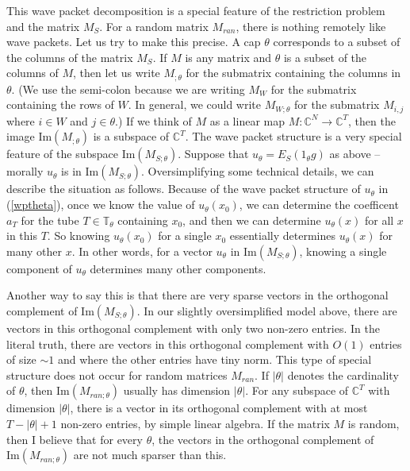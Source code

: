 \documentclass{amsart}
\newcommand{\CC}{\mathbb{C}}
\newcommand{\TT}{\mathbb{T}}
\begin{document}
\newcommand{\image}{\textrm{Im}}

This wave packet decomposition is a special feature of the restriction problem and the matrix $M_S$.   For a random matrix $M_{ran}$, there is nothing remotely like wave packets.  Let us try to make this precise.  A cap $\theta$ corresponds to a subset of the columns of the matrix $M_S$.  If $M$ is any matrix and $\theta$ is a subset of the columns of $M$, then let us write $M_{;\theta}$ for the submatrix containing the columns in $\theta$.  (We use the semi-colon because we are writing $M_W$ for the submatrix containing the rows of $W$.  In general, we could write $M_{W;\theta}$ for the submatrix $M_{i,j}$ where $i \in W$ and $j \in \theta$.)   If we think of $M$ as a linear map $M: \CC^N \rightarrow \CC^T$, then the image $\image(M_{;\theta})$ is a subspace of $\CC^T$.  The wave packet structure is a very special feature of the subspace $\image(M_{S; \theta})$.  Suppose that $u_\theta = E_S (1_\theta g)$ as above -- morally $u_\theta$ is in $\image(M_{S; \theta})$.  Oversimplifying some technical details, we can describe the situation as follows.  Because of the wave packet structure of $u_\theta$ in (\ref{wptheta}), once we know the value of $u_\theta(x_0)$, we can determine the coefficent $a_T$ for the tube $T \in \TT_\theta$ containing $x_0$, and then we can determine $u_\theta(x)$ for all $x$ in this $T$.  So knowing $u_\theta(x_0)$ for a single $x_0$ essentially determines $u_\theta(x)$ for many other $x$.  In other words, for a vector $u_\theta$ in $\image(M_{S; \theta})$, knowing a single component of $u_\theta$ determines many other components.

Another way to say this is that there are very sparse vectors in the orthogonal complement of $\image(M_{S; \theta})$.  In our slightly oversimplified model above, there are vectors in this orthogonal complement with only two non-zero entries.  In the literal truth, there are vectors in this orthogonal complement with $O(1)$ entries of size $\sim 1$ and where the other entries have tiny norm.  This type of special structure does not occur for random matrices $M_{ran}$.  If $|\theta|$ denotes the cardinality of $\theta$, then $\image(M_{ran; \theta})$ usually has dimension $|\theta|$.  For any subspace of $\CC^T$ with dimension $|\theta|$, there is a vector in its orthogonal complement with at most $T - |\theta| +1$ non-zero entries, by simple linear algebra.  If the matrix $M$ is random, then I believe that for every $\theta$, the vectors in the orthogonal complement of $\image(M_{ran; \theta})$ are not much sparser than this.
\end{document}
